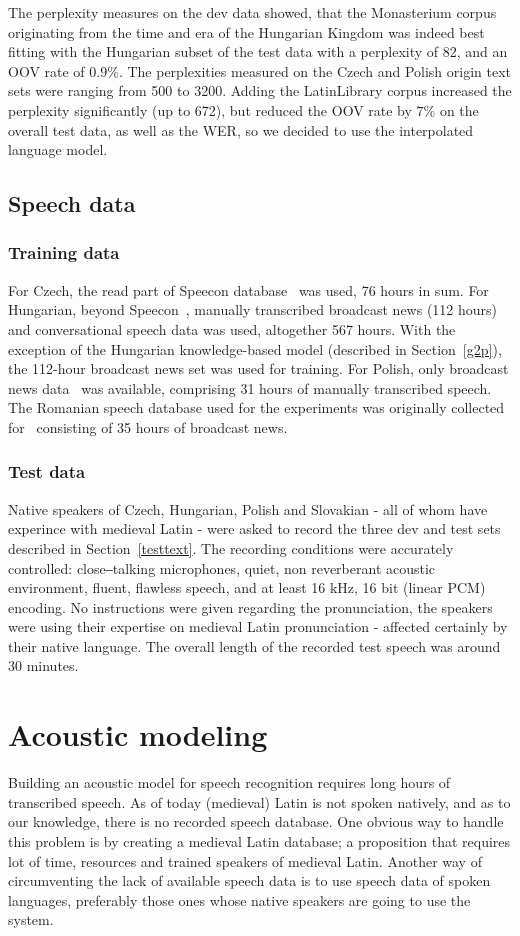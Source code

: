 \documentclass[runningheads,a4paper]{llncs}
\begin{document}
The perplexity measures on the dev data showed, that the Monasterium corpus originating from the time and era of the Hungarian Kingdom was indeed best fitting with the Hungarian subset of the test data with a perplexity of 82, and an OOV rate of $0.9\%$.
The perplexities measured on the Czech and Polish origin text sets were ranging from 500 to 3200.
Adding the LatinLibrary corpus increased the perplexity significantly (up to 672), but reduced the OOV rate by $7\%$ on the overall test data, as well as the WER, so we decided to use the interpolated language model.

\subsection{Speech data}
\subsubsection{Training data}\label{speechtraining}
For Czech, the read part of Speecon database~\cite{czech} was used, 76 hours in sum.
For Hungarian, beyond Speecon~\cite{hungarian}, manually transcribed broadcast news (112 hours) and conversational speech data was used, altogether 567 hours.
With the exception of the Hungarian knowledge-based model (described in Section~\ref{g2p}), the 112-hour broadcast news set was used for training.
For Polish, only broadcast news data~\cite{romanian} was available, comprising 31 hours of manually transcribed speech.
The Romanian speech database used for the experiments was originally collected for~\cite{romanian} consisting of 35 hours of broadcast news.
\subsubsection{Test data}
Native speakers of Czech, Hungarian, Polish and Slovakian - all of whom have experince with medieval Latin - were asked to record the three dev and test sets described in Section~\ref{testtext}.
The recording conditions were accurately controlled: close‒talking microphones, quiet, non reverberant acoustic environment, fluent, flawless speech, and at least 16 kHz, 16 bit (linear PCM) encoding.
No instructions were given regarding the pronunciation, the speakers were using their expertise on medieval Latin pronunciation - affected certainly by their native language.
The overall length of the recorded test speech was around 30 minutes.

\section{Acoustic modeling}\label{AM}
Building an acoustic model for speech recognition requires long hours of transcribed speech.
As of today (medieval) Latin is not spoken natively, and as to our knowledge, there is no recorded speech database.
One obvious way to handle this problem is by creating a medieval Latin database; a proposition that requires lot of time, resources and trained speakers of medieval Latin. 
Another way of circumventing the lack of available speech data is to use speech data of spoken languages, preferably those ones whose native speakers are going to use the system. 
\end{document}
